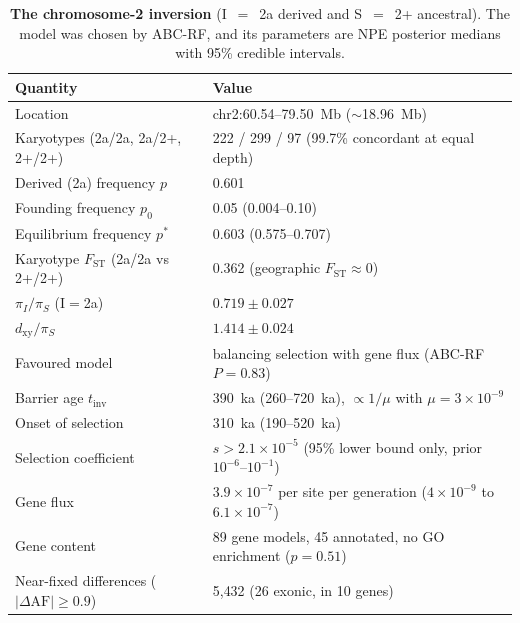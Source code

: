 \documentclass[11pt]{article}
\newcommand{\Fst}{F_\mathrm{ST}}
\newcommand{\dxy}{d_\mathrm{xy}}
\begin{document}
\begin{table}[t]\centering
  \caption{\textbf{The chromosome-2 inversion} (I~$=$~2a derived and S~$=$~2+ ancestral). The model was chosen by ABC-RF, and its parameters are NPE posterior medians with 95\% credible intervals.}
  \label{tab:inv}
  \begin{tabular}{ll}
    \toprule
    Quantity & Value \\
    \midrule
    Location                       & chr2:60.54--79.50~Mb ($\sim$18.96~Mb) \\
    Karyotypes (2a/2a, 2a/2+, 2+/2+) & 222 / 299 / 97 (99.7\% concordant at equal depth) \\
    Derived (2a) frequency $p$     & 0.601 \\
    Founding frequency $p_0$       & 0.05 (0.004--0.10) \\
    Equilibrium frequency $p^{*}$  & 0.603 (0.575--0.707) \\
    Karyotype $\Fst$ (2a/2a vs 2+/2+)        & 0.362 (geographic $\Fst\approx0$) \\
    $\pi_I/\pi_S$ (I$=$2a)         & $0.719 \pm 0.027$ \\
    $\dxy/\pi_S$                   & $1.414 \pm 0.024$ \\
    Favoured model                 & balancing selection with gene flux (ABC-RF $P=0.83$) \\
    Barrier age $t_\mathrm{inv}$   & 390~ka (260--720~ka), $\propto 1/\mu$ with $\mu=3\times10^{-9}$ \\
    Onset of selection             & 310~ka (190--520~ka) \\
    Selection coefficient          & $s>2.1\times10^{-5}$ (95\% lower bound only, prior $10^{-6}$--$10^{-1}$) \\
    Gene flux                      & $3.9\times10^{-7}$ per site per generation ($4\times10^{-9}$ to $6.1\times10^{-7}$) \\
    Gene content                   & 89 gene models, 45 annotated, no GO enrichment ($p=0.51$) \\
    Near-fixed differences ($|\Delta\mathrm{AF}|\geq0.9$) & 5{,}432 (26 exonic, in 10 genes) \\
    \bottomrule
  \end{tabular}
\end{table}
\end{document}
